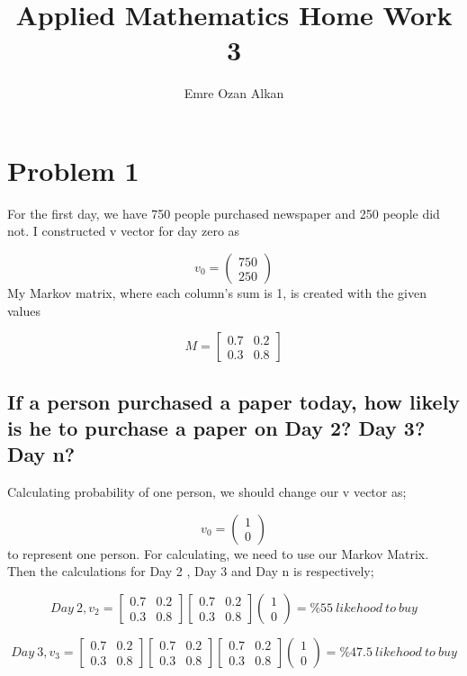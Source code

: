 \documentclass[11pt]{article} %
\title{Applied Mathematics Home Work 3}
\author{Emre Ozan Alkan}
\begin{document}
\maketitle

\section{Problem 1}

For the first day, we have 750 people purchased newspaper and 250 people did not. I constructed v vector for day zero as

$$v_{0} = 
  \begin{pmatrix} 750 \\ 250 \end{pmatrix}
$$
My Markov matrix, where each column's sum is 1, is created with the given values

$$ M = 
 \begin{bmatrix}
	0.7 & 0.2 \\ 0.3 & 0.8
 \end{bmatrix}
$$

\subsection{If a person purchased a paper today, how likely is he to purchase a paper on Day 2? Day 3? Day n?}

Calculating  probability of one person, we should change our v vector as;

$$v_{0} = 
  \begin{pmatrix} 1 \\ 0 \end{pmatrix}
$$
to represent one person. For calculating, we need to use our Markov Matrix. Then the calculations for Day 2 , Day 3 and Day n is respectively;

$$Day\ 2, v_{2} = 
   \begin{bmatrix}
	0.7 & 0.2 \\ 0.3 & 0.8
 \end{bmatrix}     \begin{bmatrix}
	0.7 & 0.2 \\ 0.3 & 0.8
 \end{bmatrix}  \begin{pmatrix} 1 \\ 0 \end{pmatrix} = \%55\ likehood\ to\ buy
$$

$$Day\ 3, v_{3} = 
   \begin{bmatrix}
	0.7 & 0.2 \\ 0.3 & 0.8
 \end{bmatrix}        \begin{bmatrix}
	0.7 & 0.2 \\ 0.3 & 0.8
 \end{bmatrix}     \begin{bmatrix}
	0.7 & 0.2 \\ 0.3 & 0.8
 \end{bmatrix}  \begin{pmatrix} 1 \\ 0 \end{pmatrix} = \%47.5\ likehood\ to\ buy
$$
\end{document}
